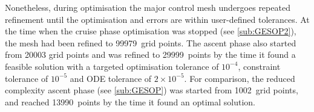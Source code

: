 Nonetheless, during optimisation the major control mesh undergoes repeated refinement until the optimisation and errors are within user-defined tolerances. At the time when the cruise phase optimisation was stopped (see \autoref{sub:GESOP2}), the mesh had been refined to 99979~grid points. The ascent phase also started from 20003 grid points and was refined to 29999~points by the time it found a feasible solution with a targeted optimisation tolerance of $10^{-4}$, constraint tolerance of $10^{-5}$ and ODE tolerance of $2\times10^{-5}$. For comparison, the reduced complexity ascent phase (see \autoref{sub:GESOP}) was started from 1002~grid points, and reached 13990~points by the time it found an optimal solution.







